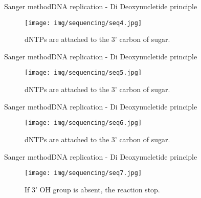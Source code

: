 \documentclass[10pt]{beamer}
\newcommand{\1}{
	\setbeamertemplate{background}{
		\texttt{[image: img/1]}
		\tikz[overlay] \fill[fill opacity=0.75,fill=white] (0,0) rectangle (-\paperwidth,\paperheight);
	}
}
\begin{document}
\begin{frame}{Sanger method}{DNA replication - Di Deoxynucletide principle}
	\begin{figure}[]
		\centering
		\texttt{[image: img/sequencing/seq4.jpg]}
		\label{img:mot2}
		\caption{dNTPs are attached to the 3' carbon of sugar.}
	\end{figure}
\end{frame}

\begin{frame}{Sanger method}{DNA replication - Di Deoxynucletide principle}
	\begin{figure}[]
		\centering
		\texttt{[image: img/sequencing/seq5.jpg]}
		\label{img:mot2}
		\caption{dNTPs are attached to the 3' carbon of sugar.}
	\end{figure}
\end{frame}

\begin{frame}{Sanger method}{DNA replication - Di Deoxynucletide principle}
	\begin{figure}[]
		\centering
		\texttt{[image: img/sequencing/seq6.jpg]}
		\label{img:mot2}
		\caption{dNTPs are attached to the 3' carbon of sugar.}
	\end{figure}
\end{frame}


\begin{frame}{Sanger method}{DNA replication - Di Deoxynucletide principle}
	\begin{figure}[]
		\centering
		\texttt{[image: img/sequencing/seq7.jpg]}
		\label{img:mot2}
		\caption{If 3' OH group is absent, the reaction stop.}
	\end{figure}
\end{frame}
\end{document}

